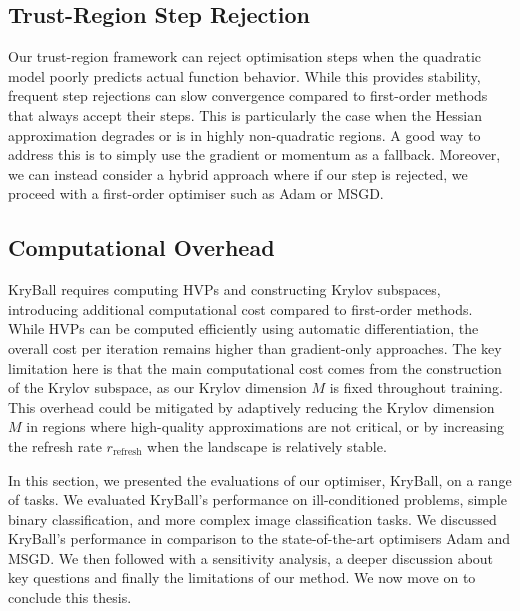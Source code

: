 \subsection{Trust-Region Step Rejection}
\label{ssec:trust_region_step_rejection}

Our trust-region framework can reject optimisation steps when the quadratic model poorly predicts actual function behavior. While this provides stability, frequent step rejections can slow convergence compared to first-order methods that always accept their steps. This is particularly the case when the Hessian approximation degrades or is in highly non-quadratic regions. A good way to address this is to simply use the gradient or momentum as a fallback. Moreover, we can instead consider a hybrid approach where if our step is rejected, we proceed with a first-order optimiser such as Adam or MSGD.

\subsection{Computational Overhead}
\label{ssec:computational_overhead}

KryBall requires computing HVPs and constructing Krylov subspaces, introducing additional computational cost compared to first-order methods. While HVPs can be computed efficiently using automatic differentiation, the overall cost per iteration remains higher than gradient-only approaches. The key limitation here is that the main computational cost comes from the construction of the Krylov subspace, as our Krylov dimension $M$ is fixed throughout training. This overhead could be mitigated by adaptively reducing the Krylov dimension $M$ in regions where high-quality approximations are not critical, or by increasing the refresh rate $r_{\text{refresh}}$ when the landscape is relatively stable.

In this section, we presented the evaluations of our optimiser, KryBall, on a range of tasks. We evaluated KryBall's performance on ill-conditioned problems, simple binary classification, and more complex image classification tasks. We discussed KryBall's performance in comparison to the state-of-the-art optimisers Adam and MSGD. We then followed with a sensitivity analysis, a deeper discussion about key questions and finally the limitations of our method. We now move on to conclude this thesis.